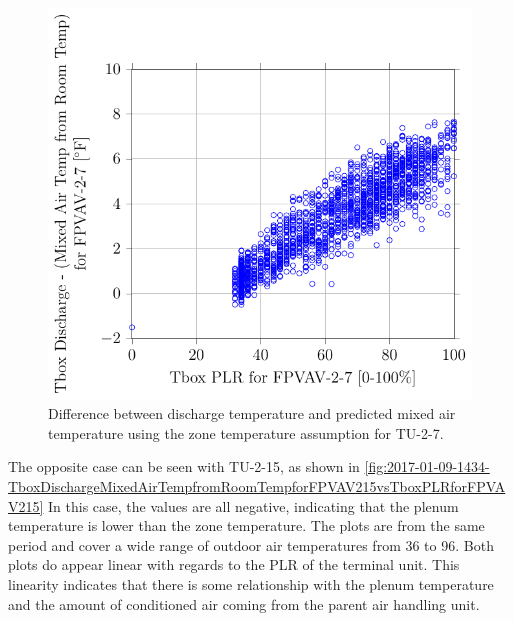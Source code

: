 \begin{figure}
\centering
\includegraphics[]{Plots/2017-01-09-1412-TboxDischargeMixedAirTempfromRoomTempforFPVAV27vsTboxPLRforFPVAV27.pdf}
\caption{Difference between discharge temperature and predicted mixed
air temperature using the zone temperature assumption for TU-2-7.}
\label{fig:2017-01-09-1412-TboxDischargeMixedAirTempfromRoomTempforFPVAV27vsTboxPLRforFPVAV27}
\end{figure}

The opposite case can be seen with TU-2-15, as shown in \figref{}
\ref{fig:2017-01-09-1434-TboxDischargeMixedAirTempfromRoomTempforFPVAV215vsTboxPLRforFPVAV215}
In this case, the values are all negative, indicating that the plenum
temperature is lower than the zone temperature. The plots are from the
same period and cover a wide range of outdoor air temperatures from
\SI{36}{\degreeF} to \SI{96}{\degreeF}. Both plots do appear linear with
regards to the PLR of the terminal unit. This linearity indicates that there is
some relationship with the plenum temperature and the amount of
conditioned air coming from the parent air handling unit.

